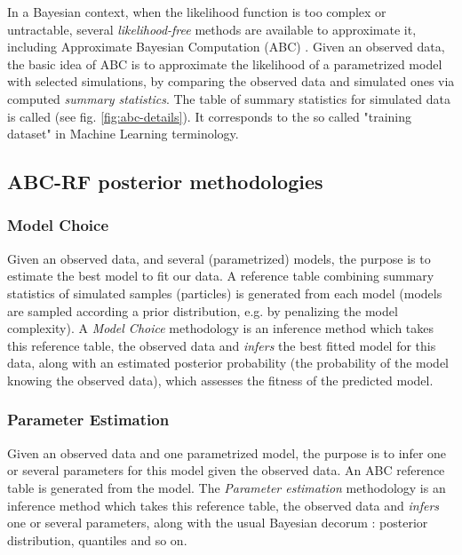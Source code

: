 \documentclass[long, final]{jobim}
\newcommand{\realemph}[1]{\mybox{\textit{#1}}}
\begin{document}
In a Bayesian context, when the likelihood function is too complex or untractable, several \emph{likelihood-free} methods are available to approximate it, including Approximate Bayesian Computation (ABC) \cite{marin2012approximate}. Given an observed data, the basic idea of ABC is to approximate the likelihood of a parametrized model with selected simulations, by comparing the observed data and simulated ones via computed \emph{summary statistics}. The table of summary statistics for simulated data is called \realemph{the reference table} (see fig. \ref{fig:abc-details}). It corresponds to the so called "training dataset" in Machine Learning terminology.

\subsection{ABC-RF posterior methodologies}
\label{sec:abc-post}

\subsubsection{Model Choice}
\label{sec:model-choice}

Given an observed data, and several (parametrized) models, the purpose is to estimate the best model to fit our data. A reference table combining summary statistics of simulated samples (particles) is generated from each model (models are sampled according a prior distribution, e.g. by penalizing the model complexity). A \emph{Model Choice} methodology is an inference method which takes this reference table, the observed data and \emph{infers} the best fitted model for this data, along with an estimated posterior probability (the probability of the model knowing the observed data), which assesses the fitness of the predicted model. 

\subsubsection{Parameter Estimation}
\label{sec:parameter-estimation}

Given an observed data and one parametrized model, the purpose is to infer one or several parameters for this model given the observed data. An ABC reference table is generated from the model. The \emph{Parameter estimation} methodology is an inference method which takes this reference table, the observed data and \emph{infers} one or several parameters, along with the usual Bayesian decorum : posterior distribution, quantiles and so on.
\end{document}
